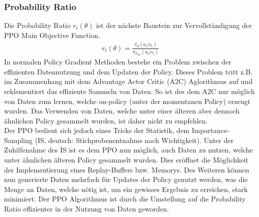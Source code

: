 \subsubsection{Probability Ratio}
Die Probability Ratio $r_{t}(\theta)$ ist der nächste Baustein zur Vervollständigung der PPO Main Objective Function. 
\begin{align}
	\label{for:Probability_Ratio}
	r_{t}(\theta) = \frac{\pi_{\theta}(a_{t}|s_{t})}{\pi_{\theta_{\text{old}}}(a_{t}|s_{t})}
\end{align}
In normalen Policy Gradient Methoden bestehe ein Problem zwischen der effizienten Datennutzung und dem Updaten der Policy. Dieses Problem tritt z.B. im Zusammenhang mit dem Advantage Actor Critic (A2C) Aglorithmus auf und reklementiert das effiziente Sammeln von Daten. So ist des dem A2C nur möglich von Daten zum lernen, welche on-policy (unter der momentanen Policy) erzeugt wurden. Das Verwenden von Daten, welche unter einer älteren aber dennoch ähnlichen Policy gesammelt wurden, ist daher nicht zu empfehlen.\\
Der PPO bedient sich jedoch eines Tricks der Statistik, dem Importance-Sampling (IS, deutsch: Stichprobenentnahme nach Wichtigkeit). 
Unter der Zuhilfenahme des IS ist es dem PPO nun möglich, auch Daten zu nutzen, welche unter ähnlichen älteren Policy gesammelt wurden. Dies eröffnet die Möglichkeit der Implementierung eines Replay-Buffers bzw. Memorys. Des Weiteren können nun generierte Daten mehrfach für Updates der Policy genutzt werden, was die Menge an Daten, welche nötig ist, um ein gewisses Ergebnis zu erreichen, stark minimiert. Der PPO Algorithmus ist durch die Umstellung auf die Probability Ratio effizienter in der Nutzung von Daten geworden.


